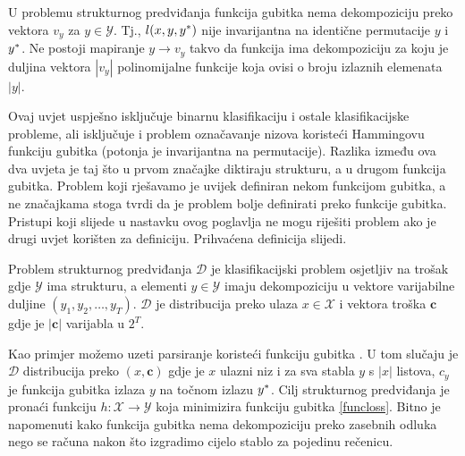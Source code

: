 \begin{condition}

  U problemu strukturnog predviđanja funkcija gubitka nema dekompoziciju preko
  vektora $v_y$ za $y \in \mathcal{Y}$. Tj., $l(x, y, y\ssymbol{1})$ nije
  invarijantna na identične permutacije $y$ i $y\ssymbol{1}$. Ne postoji
  mapiranje $y \to v_y$ takvo da funkcija ima dekompoziciju za koju je duljina
  vektora $|v_y|$ polinomijalne funkcije koja ovisi o broju izlaznih elemenata
  $|y|$.

\end{condition}

Ovaj uvjet uspješno isključuje binarnu klasifikaciju i ostale klasifikacijske
probleme, ali isključuje i problem označavanje nizova koristeći Hammingovu
funkciju gubitka (potonja je invarijantna na permutacije). Razlika između ova
dva uvjeta je taj što u prvom značajke diktiraju strukturu, a u drugom funkcija
gubitka. Problem koji rješavamo je uvijek definiran nekom funkcijom gubitka, a
ne značajkama stoga \citeauthor{daume06thesis} tvrdi da je problem bolje
definirati preko funkcije gubitka. Pristupi koji slijede u nastavku ovog
poglavlja ne mogu riješiti problem ako je drugi uvjet korišten za definiciju.
Prihvaćena definicija slijedi.

\begin{definition} \label{def:jointlearn}

  Problem strukturnog predviđanja $\mathcal{D}$ je klasifikacijski problem
  osjetljiv na trošak  gdje
  $\mathcal{Y}$ ima strukturu, a elementi $y \in \mathcal{Y}$ imaju
  dekompoziciju u vektore varijabilne duljine $(y_1, y_2, \ldots, y_T)$.
  $\mathcal{D}$ je distribucija preko ulaza $x \in \mathcal{X}$ i vektora troška
  $\mathbf{c}$ gdje je $|\mathbf{c}|$ varijabla u $2^T$.

\end{definition}

Kao primjer možemo uzeti parsiranje koristeći funkciju gubitka
. U tom slučaju je $\mathcal{D}$ distribucija preko $(x,
\mathbf{c})$ gdje je $x$ ulazni niz i za sva stabla $y$ s $|x|$ listova, $c_y$
je funkcija gubitka  izlaza $y$ na točnom izlazu
$y\ssymbol{1}$. Cilj strukturnog predviđanja je pronaći funkciju $h: \mathcal{X}
\rightarrow \mathcal{Y}$ koja minimizira funkciju gubitka \ref{funcloss}. Bitno
je napomenuti kako funkcija gubitka  nema dekompoziciju
preko zasebnih odluka nego se računa nakon što izgradimo cijelo stablo za
pojedinu rečenicu.

